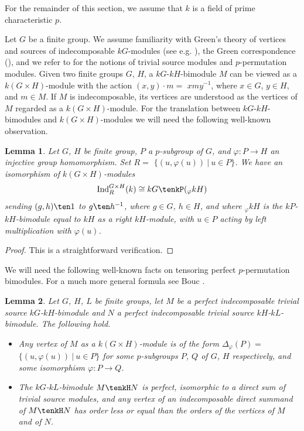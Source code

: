\documentclass{amsart}
\theoremstyle{plain}\newtheorem{Theorem}{Theorem}[section]
\theoremstyle{plain}\newtheorem{Conjecture}[Theorem]{Conjecture}
\theoremstyle{plain}\newtheorem{Corollary}[Theorem]{Corollary}
\theoremstyle{plain}\newtheorem{Lemma}[Theorem]{Lemma}
\theoremstyle{plain}\newtheorem{Proposition}[Theorem]{Proposition}
\theoremstyle{definition}\newtheorem{Definition}[Theorem]{Definition}
\theoremstyle{definition}\newtheorem{Example}[Theorem]{Example}
\theoremstyle{definition}\newtheorem{Examples}[Theorem]{Examples}
\theoremstyle{definition}\newtheorem{Exercise}[Theorem]{Exercise}
\theoremstyle{definition}\newtheorem{Notation}[Theorem]{Notation}
\theoremstyle{definition}\newtheorem{Remark}[Theorem]{Remark}
\theoremstyle{definition}\newtheorem{Remarks}[Theorem]{Remarks}
\theoremstyle{plain}\newtheorem{Statement}[Theorem]{}
\def\Ind{\mathrm{Ind}}    \def\tenC{\otimes_C}
\begin{document}
For the remainder of this section, we assume that $k$ is a field of prime  characteristic $p$.

\medskip
Let $G$ be a finite group.
We assume familiarity with Green's theory of vertices and sources of 
indecomposable $kG$-modules (see e.g. \cite[Section 5.1]{LiBookI}),
the Green correspondence (\cite[Section 5.2]{LiBookI}),
and we refer to \cite[Sections 5.10, 5.11]{LiBookII} for the notions of trivial 
source modules and $p$-permutation modules. Given two finite groups
$G$, $H$, a $kG$-$kH$-bimodule $M$ can be viewed as a $k(G\times H)$-module
with the action $(x,y)\cdot m=$ $xmy^{-1}$, where $x\in G$, $y\in H$, and $m\in M$.
If $M$ is indecomposable, its vertices are understood as the vertices of $M$
regarded as a $k(G\times H)$-module.
For the translation between $kG$-$kH$-bimodules and $k(G\times H)$-modules
we will need the following well-known observation.

\begin{Lemma} \label{bimod-Lemma}
Let $G$, $H$ be finite group, $P$ a $p$-subgroup of $G$, and $\varphi : P\to H$
an injective group homomorphism. Set $R=$ $\{(u,\varphi(u))\ |\ u\in P\}$.
We have an isomorphism of $k(G\times H)$-modules
$$\Ind^{G\times H}_R(k)\cong kG\tenkP ({_\varphi{kH}})$$ 
sending $(g,h) \ten 1$ to $g \ten h^{-1}$,  where $g\in G$, $h\in H$, and where
${_\varphi{kH}}$ is the $kP$-$kH$-bimodule equal to $kH$ as a right
$kH$-module, with $u\in P$ acting by left multiplication with $\varphi(u)$.
\end{Lemma}

\begin{proof} This is a straightforward verification.
\end{proof}

We will need the following well-known facts on tensoring perfect
$p$-permutation bimodules.
For a much more general formula see Bouc \cite[Theorem 1.1]{Bouc10}.

\begin{Lemma} \label{perfect-vertices-Lemma}
Let $G$, $H$, $L$ be finite groups, let $M$ be a perfect indecomposable 
trivial source $kG$-$kH$-bimodule and $N$ a perfect indecomposable
trivial source $kH$-$kL$-bimodule. The following hold.
\begin{itemize}
\item[{\rm (i)}]
Any vertex of $M$ as a $k(G\times H)$-module is of the form 
$\Delta_\varphi(P)=$ $\{(u,\varphi(u))\ |\ u\in P\}$ for some $p$-subgroups
$P$, $Q$ of $G$, $H$ respectively, and some isomorphism $\varphi : P\to Q$.
\item[{\rm (ii)}]
The $kG$-$kL$-bimodule $M\tenkH N$  is perfect, isomorphic to a direct sum 
of trivial source  modules, and any vertex of an indecomposable direct summand 
of $M\tenkH N$  has order less or equal than the orders of the vertices of $M$ 
and of $N$.
\end{itemize}
\end{Lemma}
\end{document}
